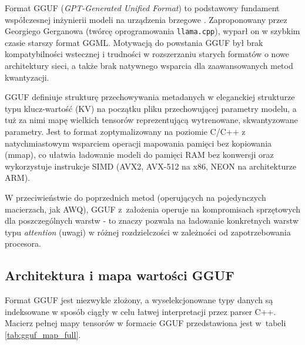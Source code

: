 Format GGUF (\textit{GPT-Generated Unified Format}) to podstawowy fundament współczesnej inżynierii modeli na urządzenia brzegowe \cite{gguf2024spec}. Zaproponowany przez Georgiego Gerganowa (twórcę oprogramowania \texttt{llama.cpp}), wyparł on w szybkim czasie starszy format GGML. Motywacją do powstania GGUF był brak kompatybilności wstecznej i trudności w rozszerzaniu starych formatów o nowe architektury sieci, a także brak natywnego wsparcia dla zaawansowanych metod kwantyzacji.

GGUF definiuje strukturę przechowywania metadanych w eleganckiej strukturze typu klucz-wartość (KV) na początku pliku przechowującej parametry modelu, a tuż za nimi mapę wielkich tensorów reprezentującą wytrenowane, skwantyzowane parametry. Jest to format zoptymalizowany na poziomie C/C++ z natychmiastowym wsparciem operacji mapowania pamięci bez kopiowania (mmap), co ułatwia ładowanie modeli do pamięci RAM bez konwersji oraz wykorzystuje instrukcje SIMD (AVX2, AVX-512 na x86, NEON na architekturze ARM).

W przeciwieństwie do poprzednich metod (operujących na pojedynczych macierzach, jak AWQ), GGUF z~założenia operuje na kompromisach sprzętowych dla poszczególnych warstw - to znaczy pozwala na ładowanie konkretnych warstw typu \textit{attention} (uwagi) w różnej rozdzielczości w zależności od zapotrzebowania procesora.

\subsection{Architektura i mapa wartości GGUF}

Format GGUF jest niezwykle złożony, a wyselekcjonowane typy danych są indeksowane w sposób ciągły w celu łatwej interpretacji przez parser C++. Macierz pełnej mapy tensorów w formacie GGUF przedstawiona jest w~tabeli \ref{tab:gguf_map_full}.

